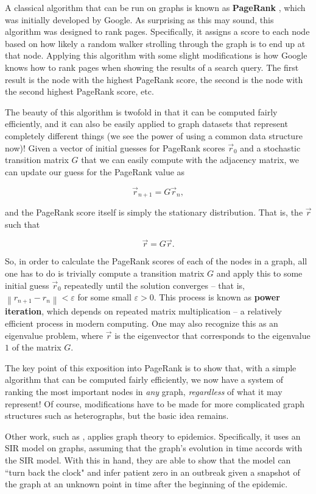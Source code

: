 \documentclass[12pt]{article}
\theoremstyle{definition}
\newcommand{\norm}[1]{\left\lVert#1\right\rVert}
\begin{document}
A classical algorithm that can be run on graphs is known as \textbf{PageRank} \cite{PageRank}, which was initially developed by Google. As surprising as this may sound, this algorithm was designed to rank pages. Specifically, it assigns a score to each node based on how likely a random walker strolling through the graph is to end up at that node. Applying this algorithm with some slight modifications is how Google knows how to rank pages when showing the results of a search query. The first result is the node with the highest PageRank score, the second is the node with the second highest PageRank score, etc. 

The beauty of this algorithm is twofold in that it can be computed fairly efficiently, and it can also be easily applied to graph datasets that represent completely different things (we see the power of using a common data structure now)! Given a vector of initial guesses for PageRank scores $\Vec{r}_0$ and a stochastic transition matrix $G$ that we can easily compute with the adjacency matrix, we can update our guess for the PageRank value as

\[
\Vec{r}_{n+1} = G \Vec{r}_n,
\]

and the PageRank score itself is simply the stationary distribution. That is, the $\Vec{r}$ such that

\[
\Vec{r} = G \Vec{r}.
\]

So, in order to calculate the PageRank scores of each of the nodes in a graph, all one has to do is trivially compute a transition matrix $G$ and apply this to some initial guess $\Vec{r}_0$ repeatedly until the solution converges -- that is, $\norm{r_{n+1} - r_{n}} < \varepsilon$ for some small $\varepsilon > 0$. This process is known as \textbf{power iteration}, which depends on repeated matrix multiplication -- a relatively efficient process in modern computing. One may also recognize this as an eigenvalue problem, where $\Vec{r}$ is the eigenvector that corresponds to the eigenvalue $1$ of the matrix $G$.

The key point of this exposition into PageRank is to show that, with a simple algorithm that can be computed fairly efficiently, we now have a system of ranking the most important nodes in \textit{any} graph, \textit{regardless} of what it may represent! Of course, modifications have to be made for more complicated graph structures such as heterographs, but the basic idea remains.

Other work, such as \cite{PhysRevLetterBayesianInferenceNetworksBeliefProp}, applies graph theory to epidemics. Specifically, it uses an SIR model \cite{SIRmodel} on graphs, assuming that the graph's evolution in time accords with the SIR model. With this in hand, they are able to show that the model can ``turn back the clock" and infer patient zero in an outbreak given a snapshot of the graph at an unknown point in time after the beginning of the epidemic.
\end{document}
